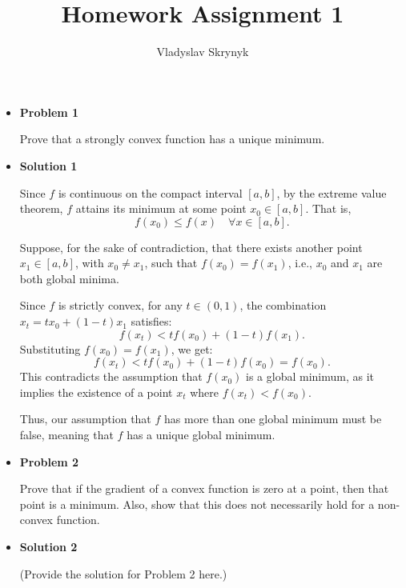 \documentclass{article}
\begin{document}
\title{Homework Assignment 1}
\date{Vladyslav Skrynyk}
\maketitle

\begin{itemize}[label=\textbullet, itemsep=10pt]
    \item \textbf{Problem 1}
    
    {\fontsize{12}{14}\selectfont Prove that a strongly convex function has a unique minimum.}
    
    \item \textbf{Solution 1}
    
	Since $f$ is continuous on the compact interval $[a,b]$, by the extreme value theorem, $f$ attains its minimum at some point $x_0 \in [a,b]$. That is,
\[
f(x_0) \leq f(x) \quad \forall x \in [a,b].
\]

Suppose, for the sake of contradiction, that there exists another point $x_1 \in [a,b]$, with $x_0 \neq x_1$, such that $f(x_0) = f(x_1)$, i.e., $x_0$ and $x_1$ are both global minima.

Since $f$ is strictly convex, for any $t \in (0,1)$, the combination $x_t = t x_0 + (1-t) x_1$ satisfies:
\[
f(x_t) < t f(x_0) + (1-t) f(x_1).
\]
Substituting $f(x_0) = f(x_1)$, we get:
\[
f(x_t) < t f(x_0) + (1-t) f(x_0) = f(x_0).
\]
This contradicts the assumption that $f(x_0)$ is a global minimum, as it implies the existence of a point $x_t$ where $f(x_t) < f(x_0)$.

Thus, our assumption that $f$ has more than one global minimum must be false, meaning that $f$ has a unique global minimum. 
  
    
    \item \textbf{Problem 2}
    
    {\fontsize{12}{14}\selectfont Prove that if the gradient of a convex function is zero at a point, then that point is a minimum. Also, show that this does not necessarily hold for a non-convex function.}
    
    \item \textbf{Solution 2}
    
    {\fontsize{12}{14}\selectfont (Provide the solution for Problem 2 here.)}
\end{itemize}
\end{document}
